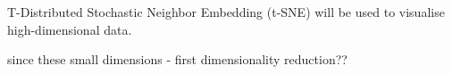\documentclass[12pt,a4paper]{article}
\begin{document}
T-Distributed Stochastic Neighbor Embedding (t-SNE) will be used to visualise high-dimensional data.  













since these small dimensions - first dimensionality reduction??














\end{document}
